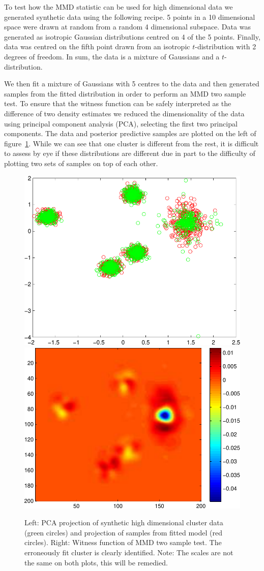 \documentclass{article} %
\begin{document}
To test how the MMD statistic can be used for high dimensional data we generated synthetic data using the following recipe.
5 points in a 10 dimensional space were drawn at random from a random 4 dimensional subspace\footnotemark.
Data was generated as isotropic Gaussian distributions centred on 4 of the 5 points.
Finally, data was centred on the fifth point drawn from an isotropic $t$-distribution with 2 degrees of freedom.
In sum, the data is a mixture of Gaussians and a $t$-distribution.

We then fit a mixture of Gaussians with 5 centres to the data and then generated samples from the fitted distribution in order to perform an MMD two sample test.
To ensure that the witness function can be safely interpreted as the difference of two density estimates we reduced the dimensionality of the data using principal component analysis (PCA), selecting the first two principal components.
The data and posterior predictive samples are plotted on the left of figure~\ref{fig:high_mog}.
While we can see that one cluster is different from the rest, it is difficult to assess by eye if these distributions are different due in part to the difficulty of plotting two sets of samples on top of each other.

\begin{figure}[ht]
\centering
\includegraphics[width=0.4\columnwidth]{figures/high_mog_fa}
\hspace{0.1\columnwidth}
\includegraphics[width=0.4\columnwidth]{figures/high_mog_witness}
\caption{
Left: PCA projection of synthetic high dimensional cluster data (green circles) and projection of samples from fitted model (red circles).
Right: Witness function of MMD two sample test. The erroneously fit cluster is clearly identified.
Note: The scales are not the same on both plots, this will be remedied.
}
\label{fig:high_mog}
\end{figure}
\end{document}
